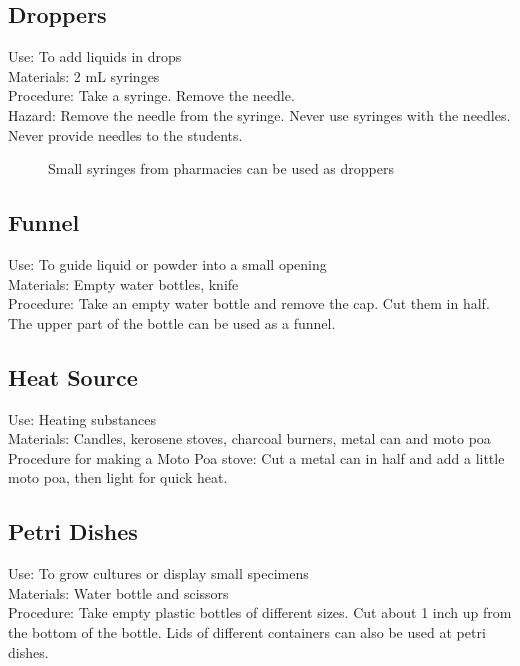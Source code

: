 \subsection*{Droppers}


Use: To add liquids in drops\\
Materials: 2 mL syringes\\
Procedure: Take a syringe. Remove the needle. \\
Hazard: Remove the needle from the syringe. Never use syringes with the needles. Never provide needles to the students.\\

\begin{figure}[H]
\begin{center}
\def\svgwidth{3cm}

\caption{Small syringes from pharmacies can be used as droppers}
\label{fig:droppers}
\end{center}
\end{figure}


\subsection*{Funnel}


Use: To guide liquid or powder into a small opening\\
Materials: Empty water bottles, knife\\
Procedure: Take an empty water bottle and remove the cap. Cut them in half. The upper part of the bottle can be used as a funnel.\\


\subsection*{Heat Source}


Use: Heating substances\\
Materials: Candles, kerosene stoves, charcoal burners, metal can and moto poa\\
Procedure for making a Moto Poa stove: Cut a metal can in half and add a little moto poa, then light for quick heat.\\


\subsection*{Petri Dishes}


Use: To grow cultures or display small specimens\\
Materials: Water bottle and scissors\\
Procedure: Take empty plastic bottles of different sizes. Cut about 1 inch up from the bottom of the bottle. Lids of different containers can also be used at petri dishes.\\


